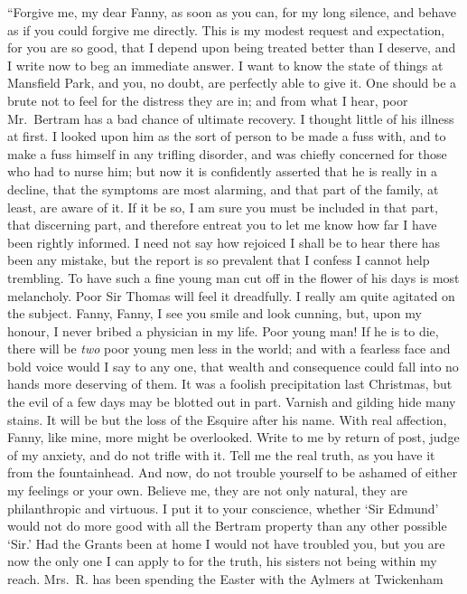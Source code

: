 \documentclass{article}
\begin{document}
``Forgive me, my dear Fanny, as soon as you can, for my
long silence, and behave as if you could forgive me directly.
This is my modest request and expectation, for you are so good,
that I depend upon being treated better than I deserve,
and I write now to beg an immediate answer.  I want to know
the state of things at Mansfield Park, and you, no doubt,
are perfectly able to give it.  One should be a brute not
to feel for the distress they are in; and from what I hear,
poor Mr.\ Bertram has a bad chance of ultimate recovery.
I thought little of his illness at first.  I looked
upon him as the sort of person to be made a fuss with,
and to make a fuss himself in any trifling disorder,
and was chiefly concerned for those who had to nurse him;
but now it is confidently asserted that he is really
in a decline, that the symptoms are most alarming,
and that part of the family, at least, are aware of it.
If it be so, I am sure you must be included in that part,
that discerning part, and therefore entreat you to let
me know how far I have been rightly informed.  I need
not say how rejoiced I shall be to hear there has been
any mistake, but the report is so prevalent that I confess
I cannot help trembling.  To have such a fine young man
cut off in the flower of his days is most melancholy.
Poor Sir Thomas will feel it dreadfully.  I really am quite
agitated on the subject.  Fanny, Fanny, I see you smile
and look cunning, but, upon my honour, I never bribed
a physician in my life.  Poor young man!  If he is to die,
there will be \emph{two} poor young men less in the world;
and with a fearless face and bold voice would I say to any one,
that wealth and consequence could fall into no hands
more deserving of them.  It was a foolish precipitation
last Christmas, but the evil of a few days may be blotted
out in part.  Varnish and gilding hide many stains.
It will be but the loss of the Esquire after his name.
With real affection, Fanny, like mine, more might be overlooked.
Write to me by return of post, judge of my anxiety,
and do not trifle with it.  Tell me the real truth,
as you have it from the fountainhead.  And now, do not
trouble yourself to be ashamed of either my feelings or
your own.  Believe me, they are not only natural, they are
philanthropic and virtuous.  I put it to your conscience,
whether `Sir Edmund' would not do more good with all
the Bertram property than any other possible `Sir.'
Had the Grants been at home I would not have troubled you,
but you are now the only one I can apply to for the truth,
his sisters not being within my reach.  Mrs.\ R. has
been spending the Easter with the Aylmers at Twickenham
\end{document}
